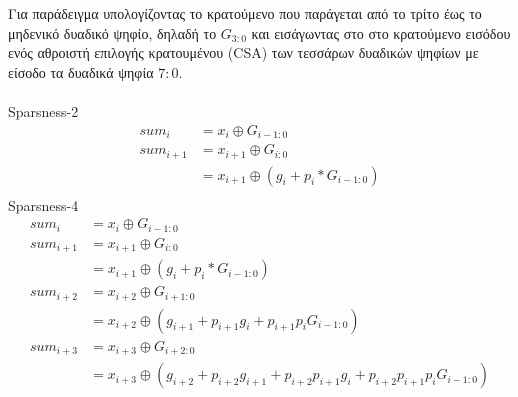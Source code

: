 Για παράδειγμα υπολογίζοντας το κρατούμενο που παράγεται από το τρίτο έως το 
μηδενικό δυαδικό ψηφίο, δηλαδή το $G_{3:0}$ και εισάγωντας στο στο κρατούμενο 
εισόδου ενός αθροιστή επιλογής κρατουμένου (CSA) των τεσσάρων δυαδικών ψηφίων 
με είσοδο τα δυαδικά ψηφία $7:0$.
\\\\ 
Sparsness-2
\begin{equation*}
    \begin{split}
        sum_i &= x_i \oplus G_{i-1:0}\\
        sum_{i+1} &= x_{i+1} \oplus G_{i:0}\\
        &= x_{i+1} \oplus (g_i + p_i*G_{i-1:0})\\
    \end{split} 
\end{equation*}
Sparsness-4
\begin{equation*}
    \begin{split}
        sum_i &= x_i \oplus G_{i-1:0}\\
        sum_{i+1} &= x_{i+1} \oplus G_{i:0}\\
        &= x_{i+1} \oplus (g_i + p_i*G_{i-1:0})\\
        sum_{i+2} &= x_{i+2} \oplus G_{i+1:0}\\
        &= x_{i+2} \oplus (g_{i+1} + p_{i+1}g_i + p_{i+1}p_iG_{i-1:0})\\
        sum_{i+3} &= x_{i+3} \oplus G_{i+2:0}\\
        &= x_{i+3} \oplus (g_{i+2} + p_{i+2}g_{i+1} + p_{i+2}p_{i+1}g_i + p_{i+2}p_{i+1}p_iG_{i-1:0})\\
    \end{split} 
\end{equation*}


















